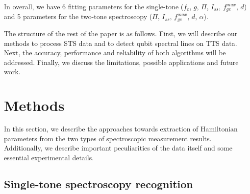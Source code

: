 \documentclass[%
 aip,
 amsmath,amssymb,
 reprint,%
]{revtex4-1}
\begin{document}
In overall, we have 6 fitting parameters for the single-tone  ($f_c$, $g$, $\Pi$, $I_{ss}$, $f_{ge}^{max}$, $d$) and  5 parameters for the two-tone spectroscopy ($\Pi$, $I_{ss}$, $f_{ge}^{max}$, $d$, $\alpha$).

The structure of the rest of the paper is as follows. First, we will describe our methods to process STS data and to detect qubit spectral lines on TTS data. Next, the accuracy, performance and reliability of both algorithms will be addressed. Finally, we discuss the limitations, possible applications and future work. 



\section{Methods}

In this section, we describe the approaches towards extraction of Hamiltonian parameters from the two types of spectroscopic measurement results. Additionally, we describe important peculiarities of the data itself and some essential experimental details.


\subsection{Single-tone spectroscopy recognition}
\end{document}
